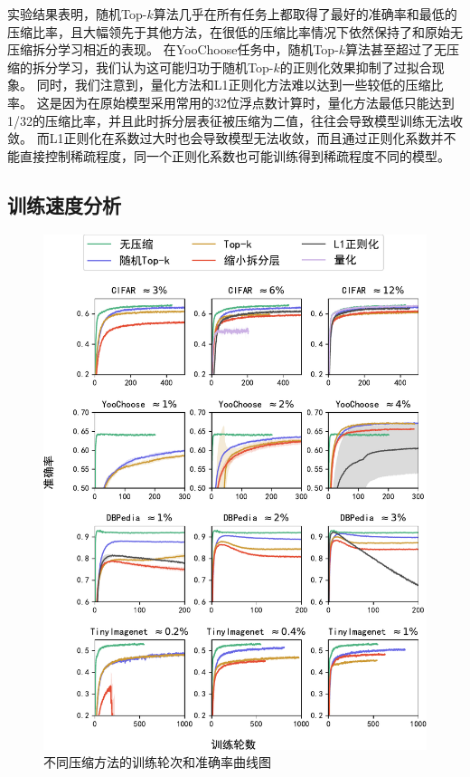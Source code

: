 实验结果表明，随机Top-$k$算法几乎在所有任务上都取得了最好的准确率和最低的压缩比率，且大幅领先于其他方法，在很低的压缩比率情况下依然保持了和原始无压缩拆分学习相近的表现。
%
在YooChoose任务中，随机Top-$k$算法甚至超过了无压缩的拆分学习，我们认为这可能归功于随机Top-$k$的正则化效果抑制了过拟合现象。
%
同时，我们注意到，量化方法和L1正则化方法难以达到一些较低的压缩比率。
这是因为在原始模型采用常用的32位浮点数计算时，量化方法最低只能达到1/32的压缩比率，并且此时拆分层表征被压缩为二值，往往会导致模型训练无法收敛。
而L1正则化在系数过大时也会导致模型无法收敛，而且通过正则化系数并不能直接控制稀疏程度，同一个正则化系数也可能训练得到稀疏程度不同的模型。
%

\subsection{训练速度分析}
\begin{figure}[h!]
    \centering
    \includegraphics[width=1\linewidth]{Z_Resources/randtopk_acc-epoch}
    \caption{不同压缩方法的训练轮次和准确率曲线图}
    \label{fig:randomized_topk:training-epoch}
\end{figure}


